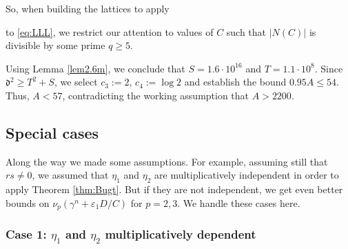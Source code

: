 \documentclass[11pt,a4paper]{article}
\numberwithin{equation}{section}
\numberwithin{table}{section}
\numberwithin{figure}{section}
\begin{document}
So, when building the lattices to apply { to \eqref{eq:LLL}, we restrict our attention to values of $C$ such that $|N(C)|$ is divisible by some prime $q\ge 5$.
	
	\medskip 
	
Using Lemma \ref{lem2.6m}, we conclude that $S =1.6 \cdot 10^{16}$ and $T = 1.1 \cdot 10^{8}$. Since $\mathfrak{d}^2 \geq T^2 + S$, we select $c_3 := 2$, $c_4 := \log 2$ and establish the bound $0.95A \leq 54$. Thus, $A<57$, contradicting the working assumption that $A>2200$.




\subsection{Special cases}
Along the way we made some assumptions. For example, assuming still that $rs\ne 0$, we assumed that $\eta_1$ and $\eta_2$ are multiplicatively independent in order to apply Theorem \ref{thm:Bugt}. But if they are not independent, we get even better bounds on $\nu_{p}(\gamma^n+\varepsilon_1 D/C)$ for $p=2,3$. We handle these cases here.

\subsubsection*{Case 1: $\eta_1$ and $\eta_2$ multiplicatively dependent}

}
\end{document}
